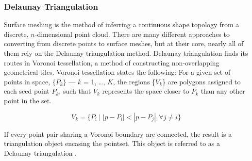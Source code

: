 \documentclass[12pt]{drexelthesis}
\let\Oldsubsection\subsection
\renewcommand{\subsection}{\FloatBarrier\Oldsubsection}
\let\Oldsubsubsection\subsubsection
\renewcommand{\subsubsection}{\FloatBarrier\Oldsubsubsection}
\begin{document}










\subsubsection{Delaunay Triangulation}
\label{subsubsec:delaunay}
Surface meshing is the method of inferring a continuous shape topology from a discrete, $n$-dimensional point cloud. There are many different approaches to converting from discrete points to surface meshes, but at their core, nearly all of them rely on the Delaunay triangulation method.
Delaunay triangulation finds its routes in Voronoi tessellation, a method of constructing non-overlapping geometrical tiles. Voronoi tessellation states the following:
For a given set of points in space, $\{P_{k}\}$ --- $k$ = 1, \ldots, $K$, the regions \{$V_{k}$\} are polygons assigned to each seed point $P_{k}$, such that $V_{k}$ represents the space closer to $P_{k}$ than any other point in the set.

\begin{equation}
	V_{k} = \{P_{i} \mid |p - P_{i}| < |p - P_{j}|, \forall j \neq i \}
\end{equation}

If every point pair sharing a Voronoi boundary are connected, the result is a triangulation object encasing the pointset. This object is referred to as a Delaunay triangulation \cite{RN65}.
\end{document}
